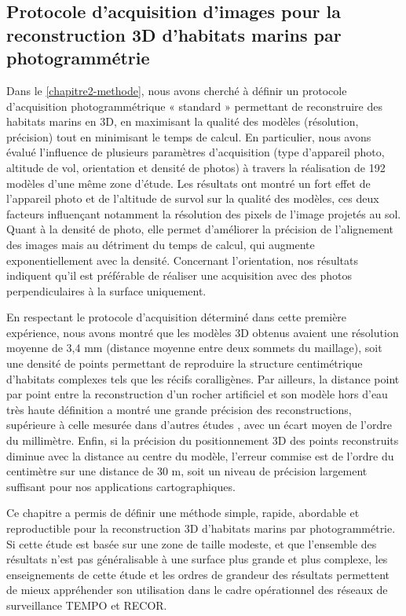 \subsection{Protocole d’acquisition d’images pour la reconstruction 3D d’habitats marins par photogrammétrie}

Dans le \autoref{chapitre2-methode}, nous avons cherché à définir un protocole d’acquisition photogrammétrique « standard » permettant de reconstruire des habitats marins en 3D, en maximisant la qualité des modèles (résolution, précision) tout en minimisant le temps de calcul. En particulier, nous avons évalué l’influence de plusieurs paramètres d’acquisition (type d’appareil photo, altitude de vol, orientation et densité de photos) à travers la réalisation de 192 modèles d’une même zone d’étude. Les résultats ont montré un fort effet de l’appareil photo et de l’altitude de survol sur la qualité des modèles, ces deux facteurs influençant notamment la résolution des pixels de l’image projetés au sol. Quant à la densité de photo, elle permet d’améliorer la précision de l’alignement des images mais au détriment du temps de calcul, qui augmente exponentiellement avec la densité. Concernant l’orientation, nos résultats indiquent qu’il est préférable de réaliser une acquisition avec des photos perpendiculaires à la surface uniquement.

En respectant le protocole d’acquisition déterminé dans cette première expérience, nous avons montré que les modèles 3D obtenus avaient une résolution moyenne de 3,4 mm (distance moyenne entre deux sommets du maillage), soit une densité de points permettant de reproduire la structure centimétrique d’habitats complexes tels que les récifs coralligènes. Par ailleurs, la distance point par point entre la reconstruction d’un rocher artificiel et son modèle hors d’eau très haute définition a montré une grande précision des reconstructions, supérieure à celle mesurée dans d’autres études \citep{figueira_accuracy_2015, bryson_characterization_2017}, avec un écart moyen de l’ordre du millimètre. Enfin, si la précision du positionnement 3D des points reconstruits diminue avec la distance au centre du modèle, l’erreur commise est de l’ordre du centimètre sur une distance de 30 m, soit un niveau de précision largement suffisant pour nos applications cartographiques.

Ce chapitre a permis de définir une méthode simple, rapide, abordable et reproductible pour la reconstruction 3D d’habitats marins par photogrammétrie. Si cette étude est basée sur une zone de taille modeste, et que l’ensemble des résultats n’est pas généralisable à une surface plus grande et plus complexe, les enseignements de cette étude et les ordres de grandeur des résultats permettent de mieux appréhender son utilisation dans le cadre opérationnel des réseaux de surveillance TEMPO et RECOR.

